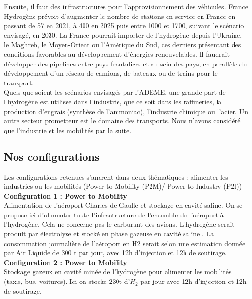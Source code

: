 \documentclass[11pt,french,a4paper]{article}
\begin{document}

Ensuite, il faut des infrastructures pour l’approvisionnement des véhicules. France Hydrogène prévoit d’augmenter le nombre de stations en service en France en passant de 57 en 2021, à 400 en 2025 puis entre 1000 et 1700, suivant le scénario envisagé, en 2030. La France pourrait importer de l’hydrogène depuis l’Ukraine, le Maghreb, le Moyen-Orient ou l’Amérique du Sud, ces derniers présentant des conditions favorables au développement d’énergies renouvelables. Il faudrait développer des pipelines entre pays frontaliers et au sein des pays, en parallèle du développement d’un réseau de camions, de bateaux ou de trains pour le transport.\\

Quels que soient les scénarios envisagés par l’ADEME, une grande part de l’hydrogène est utilisée dans l’industrie, que ce soit dans les raffineries, la production d’engrais (synthèse de l’ammoniac), l’industrie chimique ou l’acier. Un autre secteur prometteur est le domaine des transports. Nous n’avons considéré que l’industrie et les mobilités par la suite.\\

\subsection{Nos configurations}

Les configurations retenues s’ancrent dans deux thématiques : alimenter les industries ou les mobilités (Power to Mobility (P2M)/ Power to Industry (P2I)) \\
 
\textbf{Configuration 1 : Power to Mobility } \\
Alimentation de l’aéroport Charles de Gaulle et stockage en cavité saline. On se propose ici d’alimenter toute l’infrastructure de l’ensemble de l’aéroport à l’hydrogène. Cela ne concerne pas le carburant des avions. L’hydrogène serait produit par électrolyse et stocké en phase gazeuse en cavité saline . La consommation journalière de l’aéroport en H2 serait selon une estimation donnée par Air Liquide de 300 t par jour, avec 12h d’injection et 12h de soutirage. \\
 
\textbf{Configuration 2 :  Power to Mobility } \\
Stockage gazeux en cavité minée de l’hydrogène pour alimenter les mobilités (taxis, bus, voitures). Ici on stocke 230t d’$H_2$ par jour avec 12h d’injection et 12h de soutirage. \\
 
\end{document}
